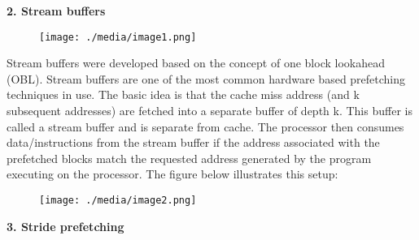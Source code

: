 \documentclass[12pt]{article}
\begin{document}
\vspace{\baselineskip}
{\fontsize{18pt}{21.6pt}\selectfont \textbf{\textcolor[HTML]{222222}{2. Stream buffers}}\par}\par


\vspace{\baselineskip}



\begin{figure}[H]
	\begin{Center}
		\texttt{[image: ./media/image1.png]}
	\end{Center}
\end{figure}



{\fontsize{15pt}{18.0pt}\selectfont \textcolor[HTML]{222222}{Stream buffers were developed based on the concept of one block lookahead (OBL). Stream buffers are one of the most common hardware based prefetching techniques in use. The basic idea is that the cache miss address (and k subsequent addresses) are fetched into a separate buffer of depth k. This buffer is called a stream buffer and is separate from cache. The processor then consumes data/instructions from the stream buffer if the address associated with the prefetched blocks match the requested address generated by the program executing on the processor. The figure below illustrates this setup:}\par}\par


\vspace{\baselineskip}



\begin{figure}[H]
	\begin{Center}
		\texttt{[image: ./media/image2.png]}
	\end{Center}
\end{figure}



\par


\vspace{\baselineskip}
{\fontsize{18pt}{21.6pt}\selectfont \textbf{\textcolor[HTML]{222222}{3. Stride prefetching}}\par}\par
\end{document}
